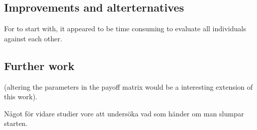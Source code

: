 \subsection{Improvements and alterternatives}
For to start with, it appeared to be time consuming to evaluate all individuals against each other.


\subsection{Further work}
(altering the parameters in the payoff matrix would be a interesting extension of this work).

Något för vidare studier vore att undersöka vad som händer om man slumpar starten.




